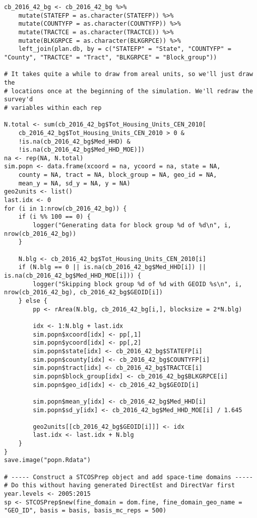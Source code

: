 \documentclass[12pt]{article}
\begin{document}
\begin{scriptsize}
\begin{verbatim}
cb_2016_42_bg <- cb_2016_42_bg %>%
    mutate(STATEFP = as.character(STATEFP)) %>%
    mutate(COUNTYFP = as.character(COUNTYFP)) %>%
    mutate(TRACTCE = as.character(TRACTCE)) %>%
    mutate(BLKGRPCE = as.character(BLKGRPCE)) %>%
    left_join(plan.db, by = c("STATEFP" = "State", "COUNTYFP" = "County", "TRACTCE" = "Tract", "BLKGRPCE" = "Block_group"))

# It takes quite a while to draw from areal units, so we'll just draw the
# locations once at the beginning of the simulation. We'll redraw the survey'd
# variables within each rep

N.total <- sum(cb_2016_42_bg$Tot_Housing_Units_CEN_2010[
    cb_2016_42_bg$Tot_Housing_Units_CEN_2010 > 0 &
    !is.na(cb_2016_42_bg$Med_HHD) &
    !is.na(cb_2016_42_bg$Med_HHD_MOE)])
na <- rep(NA, N.total)
sim.popn <- data.frame(xcoord = na, ycoord = na, state = NA,
    county = NA, tract = NA, block_group = NA, geo_id = NA,
    mean_y = NA, sd_y = NA, y = NA)
geo2units <- list()
last.idx <- 0
for (i in 1:nrow(cb_2016_42_bg)) {
    if (i %% 100 == 0) {
        logger("Generating data for block group %d of %d\n", i, nrow(cb_2016_42_bg))
    }

    N.blg <- cb_2016_42_bg$Tot_Housing_Units_CEN_2010[i]
    if (N.blg == 0 || is.na(cb_2016_42_bg$Med_HHD[i]) || is.na(cb_2016_42_bg$Med_HHD_MOE[i])) {
        logger("Skipping block group %d of %d with GEOID %s\n", i, nrow(cb_2016_42_bg), cb_2016_42_bg$GEOID[i])
    } else {
        pp <- rArea(N.blg, cb_2016_42_bg[i,], blocksize = 2*N.blg)

        idx <- 1:N.blg + last.idx
        sim.popn$xcoord[idx] <- pp[,1]
        sim.popn$ycoord[idx] <- pp[,2]
        sim.popn$state[idx] <- cb_2016_42_bg$STATEFP[i]
        sim.popn$county[idx] <- cb_2016_42_bg$COUNTYFP[i]
        sim.popn$tract[idx] <- cb_2016_42_bg$TRACTCE[i]
        sim.popn$block_group[idx] <- cb_2016_42_bg$BLKGRPCE[i]
        sim.popn$geo_id[idx] <- cb_2016_42_bg$GEOID[i]
        
        sim.popn$mean_y[idx] <- cb_2016_42_bg$Med_HHD[i]
        sim.popn$sd_y[idx] <- cb_2016_42_bg$Med_HHD_MOE[i] / 1.645

        geo2units[[cb_2016_42_bg$GEOID[i]]] <- idx
        last.idx <- last.idx + N.blg
    }
}
save.image("popn.Rdata")

# ----- Construct a STCOSPrep object and add space-time domains -----
# Do this without having generated DirectEst and DirectVar first
year.levels <- 2005:2015
sp <- STCOSPrep$new(fine_domain = dom.fine, fine_domain_geo_name = "GEO_ID", basis = basis, basis_mc_reps = 500)


\end{verbatim}
\end{scriptsize}
\end{document}
